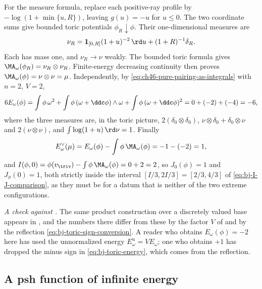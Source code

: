 \begin{example}
For the measure formula, replace each positive-ray profile by
$-\log(1+\min\{u,R\})$, leaving $g(u)=-u$ for $u\le0$.
The two coordinate sums give bounded toric potentials
$\phi_R\downarrow\phi$. Their one-dimensional measures are
\[
 \nu_R=\mathbf1_{[0,R]}(1+u)^{-2}\,\rd u
                  +(1+R)^{-1}\delta_R.
\]
Each has mass one, and $\nu_R\to\nu$ weakly. The bounded toric formula
gives $\MA_\omega(\phi_R)=\nu_R\otimes\nu_R$.
Finite-energy decreasing continuity then proves
$\MA_\omega(\phi)=\nu\otimes\nu=\mu$.
Independently, by
\eqref{eq:ch46-pure-pairing-as-integrals} with $n=2$, $V=2$,
\[
 6E_\omega(\phi)=\int\phi\,\omega^2+\int\phi\,(\omega+\ddc\phi)\wedge\omega
 +\int\phi\,(\omega+\ddc\phi)^2
 =0+(-2)+(-4)=-6 ,
\]
where the three measures are, in the toric picture,
$2(\delta_0\otimes\delta_0)$,
$\nu\otimes\delta_0+\delta_0\otimes\nu$ and $2(\nu\otimes\nu)$, and
$\int\log(1+u)\,\rd\nu=1$.  Finally
\[
 E^\vee_\omega(\mu)=E_\omega(\phi)-\int\phi\,\MA_\omega(\phi)
 =-1-(-2)=1 ,
\]
and $I(\phi,0)=\phi(v_{\triv})-\int\phi\,\MA_\omega(\phi)=0+2=2$, so
$J_0(\phi)=1$ and $J_\phi(0)=1$, both strictly inside the interval
$[I/3,2I/3]=[2/3,4/3]$ of \eqref{eq:bj-I-J-comparison}, as they must be
for a datum that is neither of the two extreme configurations.

\emph{A check against .}  The same product construction over
a discretely valued base appears in , and
the numbers there differ from these by the factor $V$ of
 and by the reflection
\eqref{eq:bj-toric-sign-conversion}.  A reader who obtains
$E_\omega(\phi)=-2$ here has used the unnormalized energy
$E^{\mathrm u}_\omega=VE_\omega$; one who obtains $+1$ has dropped the
minus sign in \eqref{eq:bj-toric-energy}, which comes from the reflection.
\end{example}

\subsection{A psh function of infinite energy}
\label{sec:ch47-ex-infinite}


